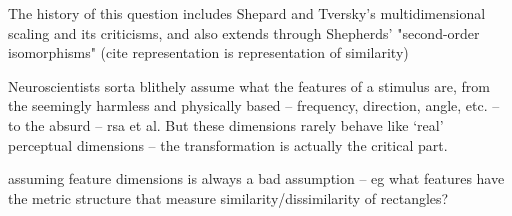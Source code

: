 \begin{multicols}{2}
The history of this question includes Shepard and Tversky's multidimensional scaling and its criticisms, and also extends through Shepherds' "second-order isomorphisms" (cite representation is representation of similarity)


Neuroscientists sorta blithely assume what the features of a stimulus are, from the seemingly harmless and physically based -- frequency, direction, angle, etc. -- to the absurd -- rsa et al. But these dimensions rarely behave like `real' perceptual dimensions \cite{krantzSimilarityRectanglesAnalysis1975a} -- the transformation is actually the critical part. 

assuming feature dimensions is always a bad assumption -- eg what features have the metric structure that measure similarity/dissimilarity of rectangles? \cite{krantzSimilarityRectanglesAnalysis1975a}

\end{multicols}

% 